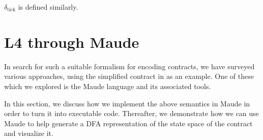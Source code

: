 \documentclass{article}
\begin{document}

$\delta_\text{tick}$ is defined similarly.




\section{L4 through Maude}

In search for such a suitable formalism for encoding contracts,
we have surveyed various approaches, using the simplified contract in
\cite[Fig 1.]{contract_as_automaton} as an example.
One of these which we explored is the Maude language and its associated tools.

In this section, we discuss how we implement the above semantics in Maude in
order to turn it into executable code.
Thereafter, we demonstrate how we can use Maude to help generate a DFA
representation of the state space of the contract and visualize it.


\end{document}
